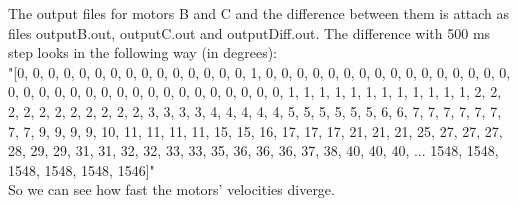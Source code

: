 \documentclass[a4paper, 12pt]{article}
\begin{document}
The output files for motors B and C and the difference between them is attach as files outputB.out, outputC.out and outputDiff.out. The difference with 500 ms step looks in the following way (in degrees):\\

"[0, 0, 0, 0, 0, 0, 0, 0, 0, 0, 0, 0, 0, 0, 0, 1, 0, 0, 0, 0, 0, 0, 0, 0, 0, 0, 0, 0, 0, 0, 0, 0, 0, 0, 0, 0, 0, 0, 0, 0, 0, 0, 0, 0, 0, 0, 0, 0, 0, 0, 1, 1, 1, 1, 1, 1, 1, 1, 1, 1, 1, 1, 2, 2, 2, 2, 2, 2, 2, 2, 2, 2, 2, 3, 3, 3, 3, 4, 4, 4, 4, 4, 5, 5, 5, 5, 5, 5, 6, 6, 7, 7, 7, 7, 7, 7, 7, 7, 9, 9, 9, 9, 10, 11, 11, 11, 11, 15, 15, 16, 17, 17, 17, 21, 21, 21, 25, 27, 27, 27, 28, 29, 29, 31, 31, 32, 32, 33, 33, 35, 36, 36, 36, 37, 38, 40, 40, 40,  ...  1548, 1548, 1548, 1548, 1548, 1546]"\\

So we can see how fast the motors' velocities diverge.
\end{document}
